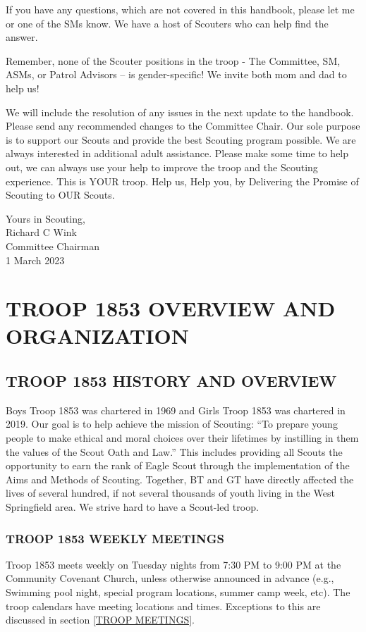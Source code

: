 \documentclass{ltxguide}
\begin{document}
If you have any questions, which are not covered in this handbook, please let me or one of the \acp{SM} know. We have a host of Scouters who can help find the answer.

Remember, none of the Scouter positions in the troop - The Committee, \ac{SM}, \acp{ASM}, or Patrol Advisors -- is gender-specific! We invite both mom and dad to help us!

We will include the resolution of any issues in the next update to the handbook. Please send any recommended changes to the Committee Chair. Our sole purpose is to support our Scouts and provide the best Scouting program possible. We are always interested in additional adult assistance. Please make some time to help out, we can always use your help to improve the troop and the Scouting experience. This is YOUR troop. Help us, Help you, by Delivering the Promise of Scouting to OUR Scouts.



Yours in Scouting,\\ 
Richard C Wink\\ 
Committee Chairman\\ 
1 March 2023

\newpage
\tableofcontents

\newpage


\section{TROOP 1853 OVERVIEW AND ORGANIZATION}

\subsection{TROOP 1853 HISTORY AND OVERVIEW}
Boys Troop 1853 was chartered in 1969 and Girls Troop 1853 was chartered in 2019. Our goal is to help achieve the mission of Scouting: “To prepare young people to make ethical and moral choices over their lifetimes by instilling in them the values of the Scout Oath and Law.” This includes providing all Scouts the opportunity to earn the rank of Eagle Scout through the implementation of the Aims and Methods of Scouting. Together, \ac{BT} and \ac{GT} have directly affected the lives of several hundred, if not several thousands of youth living in the West Springfield area. We strive hard to have a Scout-led troop.

\subsubsection{TROOP 1853 WEEKLY MEETINGS}
Troop 1853 meets weekly on Tuesday nights from 7:30 PM to 9:00 PM at the Community Covenant Church, unless otherwise announced in advance (e.g., Swimming pool night, special program locations, summer camp week, etc). The troop calendars have meeting locations and times. Exceptions to this are discussed in section \ref{TROOP MEETINGS}.
\end{document}
